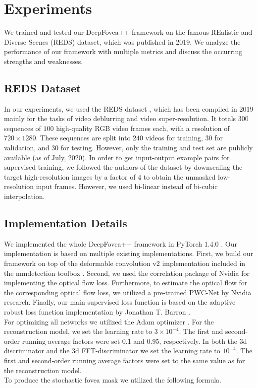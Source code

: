 \documentclass[10pt,twocolumn,letterpaper]{article}
\begin{document}
	\section{Experiments} \label{sec:experiments}
	We trained and tested our DeepFovea++ framework on the famous REalistic and Diverse Scenes (REDS) dataset, which was published in 2019. We analyze the performance of our framework with multiple metrics and discuss the occurring strengths and weaknesses.
	
	\subsection{REDS Dataset} \label{subsec:redsdataset}
	In our experiments, we used the REDS dataset \cite{REDS}, which has been compiled in 2019 mainly for the tasks of video deblurring and video super-resolution. It totals $300$ sequences of $100$ high-quality RGB video frames each, with a resolution of $720\times 1280$. These sequences are split into $240$ videos for training, $30$ for validation, and $30$ for testing. However, only the training and test set are publicly available (as of July, 2020). In order to get input-output example pairs for supervised training, we followed the authors of the dataset by downscaling the target high-resolution images by a factor of $4$ to obtain the unmasked low-resolution input frames. However, we used bi-linear instead of bi-cubic interpolation. \cite{REDS}
	
	
	\subsection{Implementation Details} \label{subsec:implementationdetails}
	We implemented the whole DeepFovea++ framework in PyTorch 1.4.0 \cite{pytorch}. Our implementation is based on multiple existing implementations. First, we build our framework on top of the deformable convolution v2 \cite{deformableconv} implementation included in the mmdetection toolbox \cite{mmdetection}. Second, we used the correlation package \cite{flownet2} of Nvidia for implementing the optical flow loss. Furthermore, to estimate the optical flow for the corresponding optical flow loss, we utilized a pre-trained PWC-Net \cite{pwcnet} by Nvidia research. Finally, our main supervised loss function is based on the adaptive robust loss function implementation by Jonathan T. Barron \cite{adaptiveroubustloss}.\\
	
	For optimizing all networks we utilized the Adam optimizer \cite{adam}. For the reconstruction model, we set the learning rate to $3\times 10^{-4}$. The first and second-order running average factors were set 0.1 and 0.95, respectively. In both the 3d discriminator and the 3d FFT-discriminator we set the learning rate to $10^{-4}$. The first and second-order running average factors were set to the same value as for the reconstruction model.\\
	To produce the stochastic fovea mask we utilized the following formula.
	
\end{document}
